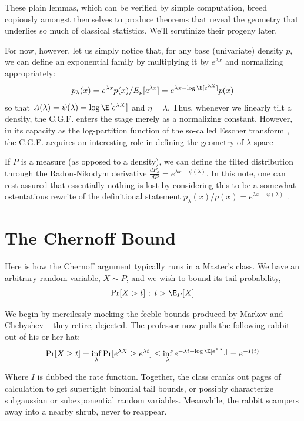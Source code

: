 \documentclass[
  letterpaper,
  DIV=11,
  numbers=noendperiod]{scrartcl}
\begin{document}
These plain lemmas, which can be verified by simple computation, breed
copiously amongst themselves to produce theorems that reveal the
geometry that underlies so much of classical statistics. We'll
scrutinize their progeny later.

For now, however, let us simply notice that, for any base (univariate)
density \(p\), we can define an exponential family by multiplying it by
\(e^{\lambda x}\) and normalizing appropriately:
\[p_\lambda(x) = e^{\lambda x}p(x)/E_p[e^{\lambda x}] = e^{\lambda x - \log \E [e^{\lambda X}]}p(x)\]
so that \(A(\lambda) = \psi(\lambda) = \log \E [e^{\lambda X}]\) and
\(\eta = \lambda\). Thus, whenever we linearly tilt a density, the
C.G.F. enters the stage merely as a normalizing constant. However, in
its capacity as the log-partition function of the so-called Esscher
transform , the C.G.F. acquires an interesting role in defining the
geometry of \(\lambda\)-space

If \(P\) is a measure (as opposed to a density), we can define the
tilted distribution through the Radon-Nikodym derivative
\(\frac{dP_\lambda}{dP} = e^{\lambda x - \psi(\lambda)}\). In this note,
one can rest assured that essentially nothing is lost by considering
this to be a somewhat ostentatious rewrite of the definitional statement
\(p_\lambda(x)/p(x) = e^{\lambda x - \psi(\lambda)}\) .

\section{The Chernoff Bound}\label{the-chernoff-bound}

Here is how the Chernoff argument typically runs in a Master's class. We
have an arbitrary random variable, \(X \sim P\), and we wish to bound
its tail probability, \[\Pr[X > t] \ ; \ t > \E_P[X]\]

We begin by mercilessly mocking the feeble bounds produced by Markov and
Chebyshev -- they retire, dejected. The professor now pulls the
following rabbit out of his or her hat:
\[\mathrm{Pr}[X \geq t] = \inf_\lambda \mathrm{Pr}[e^{\lambda X} \geq e^{\lambda t}] \leq \inf_\lambda e^{- \lambda t + \log \E[e^{\lambda X}]]} = e^{-I(t)} \]

Where \(I\) is dubbed the rate function. Together, the class cranks out
pages of calculation to get supertight binomial tail bounds, or possibly
characterize subgaussian or subexponential random variables. Meanwhile,
the rabbit scampers away into a nearby shrub, never to reappear.
\end{document}
